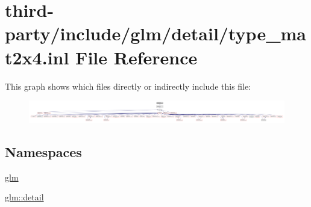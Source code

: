 \hypertarget{type__mat2x4_8inl}{}\section{third-\/party/include/glm/detail/type\+\_\+mat2x4.inl File Reference}
\label{type__mat2x4_8inl}
This graph shows which files directly or indirectly include this file\+:
\nopagebreak
\begin{figure}[H]
\begin{center}
\leavevmode
\includegraphics[width=350pt]{type__mat2x4_8inl__dep__incl}
\end{center}
\end{figure}
\subsection*{Namespaces}
\begin{DoxyCompactItemize}
\item 
 \hyperlink{namespaceglm}{glm}
\item 
 \hyperlink{namespaceglm_1_1detail}{glm\+::detail}
\end{DoxyCompactItemize}
